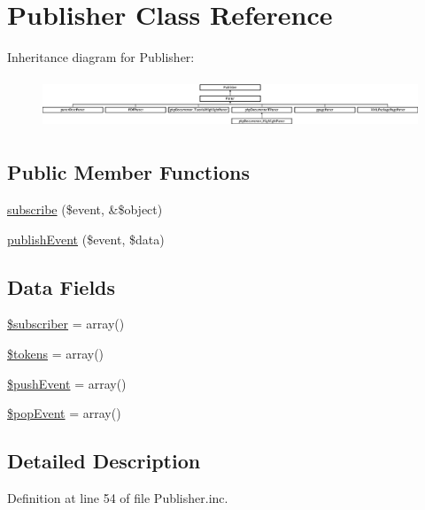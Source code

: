 \hypertarget{class_publisher}{\section{\-Publisher \-Class \-Reference}
\label{class_publisher}
}
\-Inheritance diagram for \-Publisher\-:\begin{figure}[H]
\begin{center}
\leavevmode
\includegraphics[height=1.523810cm]{class_publisher}
\end{center}
\end{figure}
\subsection*{\-Public \-Member \-Functions}
\begin{DoxyCompactItemize}
\item 
\hyperlink{class_publisher_ad2ed420fdc63206cf2ae1385156661f8}{subscribe} (\$event, \&\$object)
\item 
\hyperlink{class_publisher_a2fdf38edad335537a86c7bb35fec3106}{publish\-Event} (\$event, \$data)
\end{DoxyCompactItemize}
\subsection*{\-Data \-Fields}
\begin{DoxyCompactItemize}
\item 
\hyperlink{class_publisher_aa529fc6e5ab7f12c92aa75cd866fdd81}{\$subscriber} = array()
\item 
\hyperlink{class_publisher_a72ead29e4317fbc4335fd3ba764e8b59}{\$tokens} = array()
\item 
\hyperlink{class_publisher_afa3ebd7022a716d664b6e3bae77e0e4c}{\$push\-Event} = array()
\item 
\hyperlink{class_publisher_a12bfa5a88d0884472fa0aa48d7b48ab7}{\$pop\-Event} = array()
\end{DoxyCompactItemize}


\subsection{\-Detailed \-Description}


\-Definition at line 54 of file \-Publisher.\-inc.



